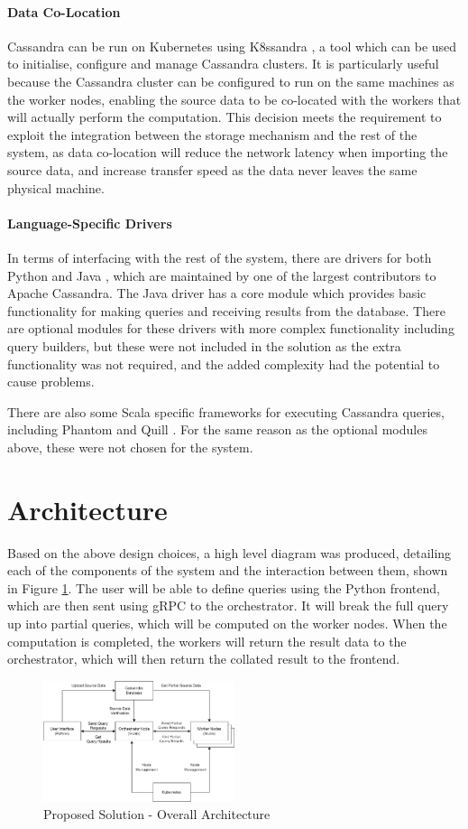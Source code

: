 \paragraph{Data Co-Location} Cassandra can be run on Kubernetes using K8ssandra \cite{k8ssandra}, a tool which can be used to initialise, configure and manage Cassandra clusters. It is particularly useful because the Cassandra cluster can be configured to run on the same machines as the worker nodes, enabling the source data to be co-located with the workers that will actually perform the computation. This decision meets the requirement to exploit the integration between the storage mechanism and the rest of the system, as data co-location will reduce the network latency when importing the source data, and increase transfer speed as the data never leaves the same physical machine. 

\paragraph{Language-Specific Drivers} In terms of interfacing with the rest of the system, there are drivers for both Python and Java , which are maintained by one of the largest contributors to Apache Cassandra. The Java driver has a core module which provides basic functionality for making queries and receiving results from the database. There are optional modules for these drivers with more complex functionality including query builders, but these were not included in the solution as the extra functionality was not required, and the added complexity had the potential to cause problems. 

There are also some Scala specific frameworks for executing Cassandra queries, including Phantom and Quill . For the same reason as the optional modules above, these were not chosen for the system.

\section{Architecture}\label{sec:architecture}
Based on the above design choices, a high level diagram was produced, detailing each of the components of the system and the interaction between them, shown in Figure \ref{fig:overall-architecture}. The user will be able to define queries using the Python frontend, which are then sent using gRPC to the orchestrator. It will break the full query up into partial queries, which will be computed on the worker nodes. When the computation is completed, the workers will return the result data to the orchestrator, which will then return the collated result to the frontend.

\begin{figure}[h]
	\centering
	\includegraphics[width=0.5\textwidth]{chapters/diagrams/design/architecture-overall}
	\caption{Proposed Solution - Overall Architecture}
	\label{fig:overall-architecture}
\end{figure}

